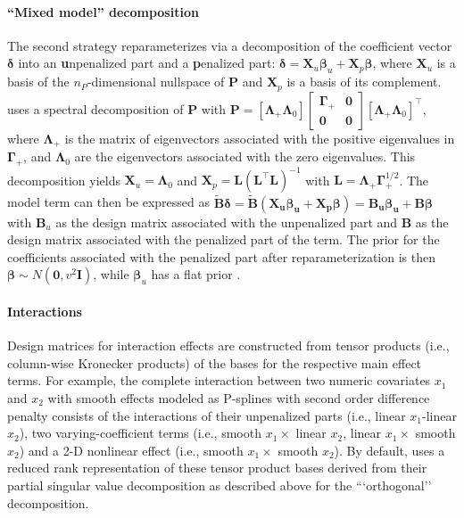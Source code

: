 \documentclass[article, shortnames, nojss, noheadings, notitle]{jss}
\begin{document}
\paragraph*{``Mixed model'' decomposition}
The second strategy reparameterizes via a decomposition of the coefficient
vector $\bm\delta$ into an \textbf{u}npenalized part and a \textbf{p}enalized part:
$\bm \delta= \bm X_u \bm\beta_u + \bm X_p \bm
\beta$, where $\bm X_u$ is a
basis of the $n_P$-dimensional nullspace of $\bm P$ and $\bm X_p$ is
a basis of its complement.  uses a spectral
decomposition of $\bm P$ with
 $\bm P = [\bm \Lambda_+ \bm \Lambda_0] \left[\begin{smallmatrix} \bm \Gamma_+ & \bm 0 \\ \bm
 0 & \bm 0\end{smallmatrix}\right] [\bm \Lambda_+  \bm \Lambda_0]^\top$,
where $\bm \Lambda_+$ is the matrix of eigenvectors associated with the
positive eigenvalues in $\bm \Gamma_+$, and $\bm \Lambda_0$ are the
eigenvectors associated with the zero eigenvalues.  This decomposition yields
$\bm X_u = \bm \Lambda_0$  and $\bm X_p = \bm L(\bm L^\top \bm L)^{-1}$
with $\bm{L} = \bm \Lambda_+ \bm{\Gamma}_+^{1/2}$. The model term can then be expressed as
$ \bm{\tilde{B}\delta} = \bm{\tilde{B}(\bm X_u \bm\beta_u + \bm X_p \bm \beta)=\bm{B}_u \beta_u} + \bm{B
\beta}$
with $\bm{B}_u$ as the design matrix associated with the unpenalized
part and $\bm B$ as the design matrix associated with the
pena\-lized part of the term. The prior for the coefficients associated with the penalized part
after re\-pa\-ra\-me\-teriza\-tion is then $\bm \beta \sim
N(\bm 0, v^2 \bm I)$, while $\bm \beta_u$ has a flat prior \citep[c.f.][ch. 5.1]{Kneib:06}.

\paragraph*{Interactions}
Design matrices for interaction effects are constructed from tensor products
(i.e., column-wise Kronecker products)
of the bases for the respective main effect terms.
For example, the complete interaction between two numeric
covariates $x_1$ and $x_2$ with smooth effects modeled as P-splines with second order difference penalty
consists of the interactions of their unpenalized parts (i.e., linear $x_1$-linear $x_2$),
two varying-coefficient terms (i.e., smooth $x_1 \times$ linear $x_2$, linear $x_1 \times$ smooth $x_2$) and a
2-D nonlinear effect (i.e., smooth $x_1 \times$ smooth $x_2$).
By default,  uses a reduced rank representation of these tensor product bases derived from
their partial singular value decomposition as described above for the ```orthogonal'' decomposition.
\end{document}
